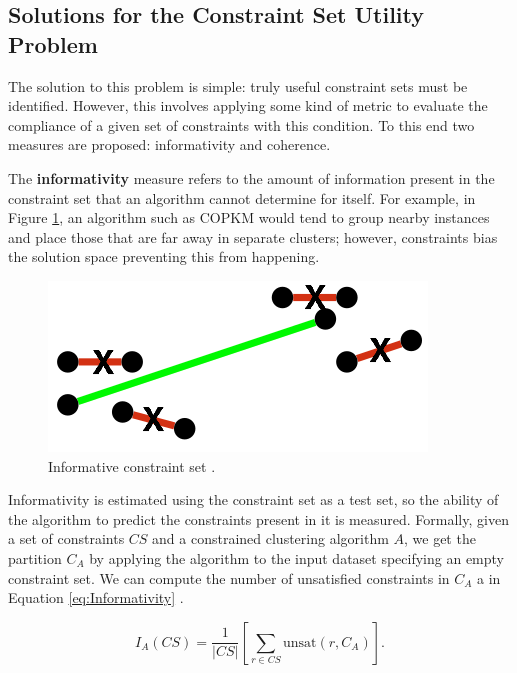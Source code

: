 \subsection{Solutions for the Constraint Set Utility Problem}

The solution to this problem is simple: truly useful constraint sets must be identified. However, this involves applying some kind of metric to evaluate the compliance of a given set of constraints with this condition. To this end two measures are proposed: informativity and coherence.

The \textbf{informativity} measure refers to the amount of information present in the constraint set that an algorithm cannot determine for itself. For example, in Figure \ref{fig:Informativity}, an algorithm such as \acs{COPKM} would tend to group nearby instances and place those that are far away in separate clusters; however, constraints bias the solution space preventing this from happening. 

\begin{figure}[!h]
	\centering
	\includegraphics[scale=0.4]{gfx/ConstClust/Inform/Inform} 
	\caption[Informative constraint set.]{Informative constraint set \cite{davidson2007survey}.}\label{fig:Informativity}
\end{figure}


Informativity is estimated using the constraint set as a test set, so the ability of the algorithm to predict the constraints present in it is measured. Formally, given a set of constraints $CS$ and a constrained clustering algorithm $A$, we get the partition $C_A$ by applying the algorithm to the input dataset specifying an empty constraint set. We can compute the number of unsatisfied constraints in $C_A$ a in Equation \ref{eq:Informativity} \cite{davidson2007survey}.

\begin{equation}
I_A(CS) = \frac{1}{|CS|}\left[ \sum_{r \in CS} \text{unsat}(r, C_A) \right].
\label{eq:Informativity}
\end{equation}

